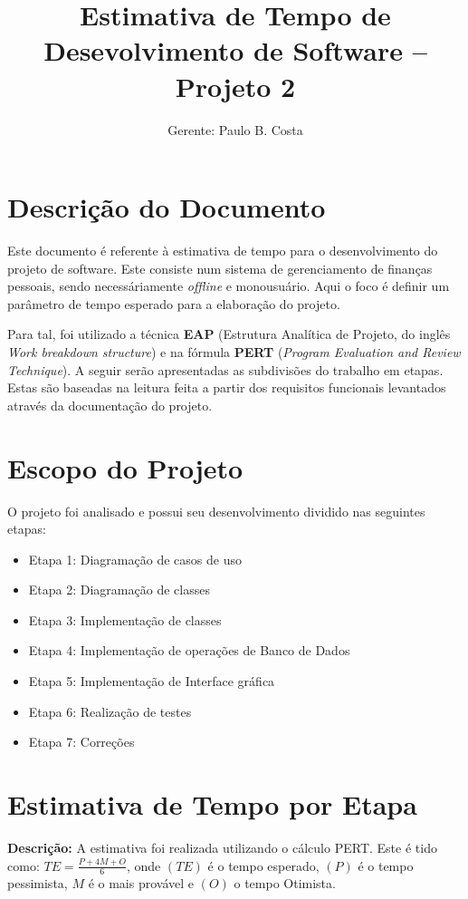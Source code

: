 \documentclass[12pt,a4paper]{report}
\author{Gerente: Paulo B. Costa}
\title{Estimativa de Tempo de Desevolvimento de Software -- Projeto 2}
\begin{document}
	\maketitle
	\section*{Descrição do Documento}
	\quotation
	\quad Este documento é referente à estimativa de tempo para o desenvolvimento do projeto de software. Este consiste num sistema de gerenciamento de finanças pessoais, sendo necessáriamente \textit{offline} e monousuário. Aqui o foco é definir um parâmetro de tempo esperado para a elaboração do projeto.
	
	\quad Para tal, foi utilizado a técnica \textbf{EAP} (Estrutura Analítica de Projeto, do inglês \textit{Work breakdown structure}) e na fórmula \textbf{PERT} (\textit{Program Evaluation and Review Technique}). A seguir serão apresentadas as subdivisões do trabalho em etapas. Estas são baseadas na leitura feita a partir dos requisitos funcionais levantados através da documentação do projeto. 
	\section*{Escopo do Projeto}
	\quad O projeto foi analisado e possui seu desenvolvimento dividido nas seguintes etapas:
	\begin{itemize} 
		\item Etapa 1: Diagramação de casos de uso
		\item Etapa 2: Diagramação de classes
		\item Etapa 3: Implementação de classes
		\item Etapa 4: Implementação de operações de Banco de Dados
		\item Etapa 5: Implementação de Interface gráfica
		\item Etapa 6: Realização de testes
		\item Etapa 7: Correções
		
	\end{itemize}
	\section*{Estimativa de Tempo por Etapa}
	\textbf{Descrição:} A estimativa foi realizada utilizando o cálculo PERT. Este é tido como:
	$TE = \frac{P + 4M + O}{6}$, onde $(TE)$ é o tempo esperado, $(P)$ é o tempo pessimista, $M$ é o mais provável e $(O)$ o tempo Otimista.
	
\end{document}

